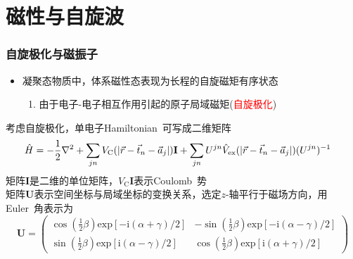\documentclass[cjk,slidestop,compress,mathserif,blue]{beamer}
\begin{document}
\section{磁性与自旋波}
\frame
{
	\frametitle{自旋极化与磁振子}
	\begin{itemize}
		\item 凝聚态物质中，体系磁性态表现为长程的自旋磁矩有序状态
			\begin{enumerate}
				\item 由于电子-电子相互作用引起的原子局域磁矩(\textcolor{red}{自旋极化})
			\end{enumerate}
	\end{itemize}
		考虑自旋极化，单电子\textrm{Hamiltonian~}可写成二维矩阵
			\begin{displaymath}
				\hspace*{-10pt}\hat H=-\frac12\nabla^2+\sum_{jn}V_{\mathrm C}(|\vec r-\vec t_n-\vec a_j|)\mathbf{I}+\sum_{jn}U^{jn}\hat{V}_{\mathrm{ex}}(|\vec r-\vec t_n-\vec a_j|)(U^{jn})^{-1}
			\end{displaymath}
			矩阵$\mathbf{I}$是二维的单位矩阵，$V_{\mathrm{C}}\mathbf{I}$表示\textrm{Coulomb~}势\\
			矩阵$\mathbf{U}$表示空间坐标与局域坐标的变换关系，选定$z$-轴平行于磁场方向，用\textrm{Euler~}角表示为
			\begin{displaymath}
				\mathbf{U}=\left(
				\begin{matrix}
					\cos(\frac12\beta)\mathrm{exp}[-\mathrm{i}(\alpha+\gamma)/2] &-\sin(\frac12\beta)\mathrm{exp}[-\mathrm{i}(\alpha-\gamma)/2]\\
					\sin(\frac12\beta)\mathrm{exp}[\mathrm{i}(\alpha-\gamma)/2] &\cos(\frac12\beta)\mathrm{exp}[\mathrm{i}(\alpha+\gamma)/2]
				\end{matrix}\right)
			\end{displaymath}
		}
\end{document}
